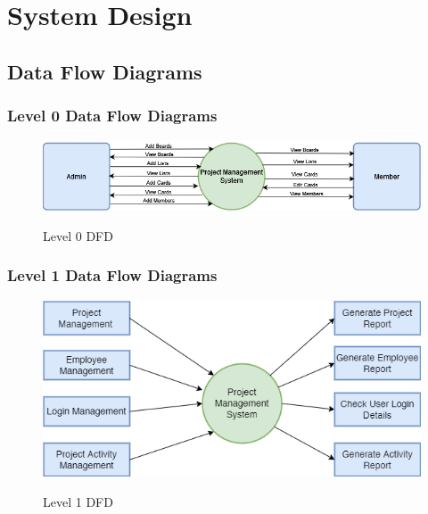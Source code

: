 \clearpage
\chapter{System Design}
\section{Data Flow Diagrams}

\subsection{Level 0 Data Flow Diagrams}
\begin{figure}[!htbp]
    \centering
    \includegraphics[scale = 0.6]{dataflow0.png}\\[0.1in]
    \caption{Level 0 DFD}
    \label{fig:my_label}
\end{figure}
\FloatBarrier


\subsection{Level 1 Data Flow Diagrams}
\begin{figure}[!htbp]
    \centering
    \includegraphics[scale = 0.6]{DFDlev1.drawio.png}\\[0.1in]
    \caption{Level 1 DFD}
    \label{fig:my_label}
\end{figure}
\FloatBarrier

